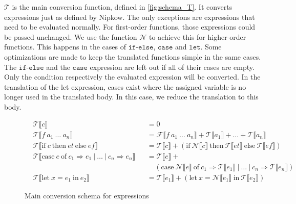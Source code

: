 $\mathcal{T}$ is the main conversion function, defined in \autoref{fig:schema_T}.
It converts expressions just as defined by Nipkow.
The only exceptions are expressions that need to be evaluated normally.
For first-order functions, those expressions could be passed unchanged.
We use the function $\mathcal{N}$ to achieve this for higher-order functions.
This happens in the cases of $\texttt{if-else}$, $\texttt{case}$ and $\texttt{let}$.
Some optimizations are made to keep the translated functions simple in the same cases.
The $\texttt{if-else}$ and the $\texttt{case}$ expression are left out if all of their cases are empty.
Only the condition respectively the evaluated expression will be converted.
In the translation of the let expression, cases exist where the assigned variable is no longer used in the translated body.
In this case, we reduce the translation to this body.

\begin{figure}
\begin{align*}
  &\mathcal{T}\llbracket c\rrbracket &&= 0\\
  &\mathcal{T}\llbracket f\ a_{1}\ \dots\ a_{n}\rrbracket &&= \mathcal{F}\llbracket f\ a_{1}\ \dots\ a_{n}\rrbracket + \mathcal{T}\llbracket a_{1}\rrbracket + \dots + \mathcal{T}\llbracket a_{n}\rrbracket\\
  &\mathcal{T}\llbracket \text{if}\ c\ \text{then}\ et\ \text{else}\ ef\rrbracket &&= \mathcal{T}\llbracket c\rrbracket + (\text{if}\ \mathcal{N}\llbracket c\rrbracket\ \text{then}\ \mathcal{T}\llbracket et\rrbracket\ \text{else}\ \mathcal{T}\llbracket ef\rrbracket)\\
  &\mathcal{T}\llbracket \text{case}\ e\ \text{of}\ c_{1} \Rightarrow e_{1}\ |\ \dots\ |\ c_{n}\Rightarrow e_{n}\rrbracket &&= \mathcal{T}\llbracket e\rrbracket + \\
  & &&\ \ \ \ \ (\text{case}\ \mathcal{N}\llbracket e\rrbracket\ \text{of}\ c_{1}\Rightarrow\mathcal{T}\llbracket e_{1}\rrbracket\ |\ \dots\ |\ c_{n} \Rightarrow \mathcal{T}\llbracket e_{n}\rrbracket)\\
  &\mathcal{T}\llbracket \text{let}\ x = e_{1}\ \text{in}\ e_{2}\rrbracket &&= \mathcal{T}\llbracket e_{1}\rrbracket + (\text{let}\ x = \mathcal{N}\llbracket e_{1}\rrbracket\ \text{in}\ \mathcal{T}\llbracket e_{2}\rrbracket)
\end{align*}
  \caption{Main conversion schema for expressions}
  \label{fig:schema_T}
\end{figure}

